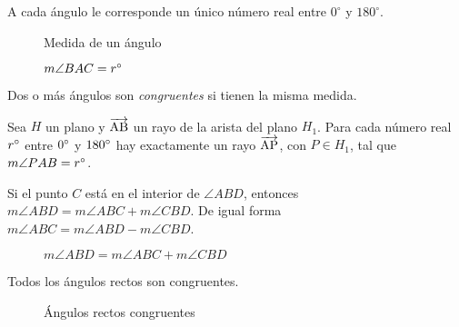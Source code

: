 \begin{postulate}
    A cada ángulo le corresponde un único número real entre $0^{\circ}$ y $180^{\circ}$.

\begin{figure}[!h]
    \centering
    
    \label{fig:angle-measure}
    \caption{Medida de un ángulo}
    \caption{$m\angle{BAC}=r^{\circ}$}
\end{figure}

\end{postulate}

\clearpage

\begin{definition}
    Dos o más ángulos son \textit{congruentes} si tienen la misma medida.
\end{definition}


\begin{postulate}
    Sea $H$ un plano y $\overrightarrow{\rm AB}$ un rayo de la arista del plano $H_1$. Para cada número real $r^{\circ}$ entre $0^{\circ}$ y $180^{\circ}$ hay exactamente un rayo $\overrightarrow{\rm AP}$, con $P \in H_1$, tal que $m\angle{PAB} = r^{\circ}$.

    \begin{figure}[!h]
        \centering
        
        \label{fig:angle-construction}
    \end{figure}
    
\end{postulate}

\begin{postulate}
    Si el punto $C$ está en el interior de $\angle{ABD}$, entonces $m\angle{ABD} = m\angle{ABC} + m\angle{CBD}$. De igual forma $m\angle{ABC} = m\angle{ABD} - m\angle{CBD}$.


    \begin{figure}[!h]
        \centering
        
        \label{fig:angle-addition}
        \caption{$m\angle{ABD} = m\angle{ABC} + m\angle{CBD}$}
    \end{figure}
    
\end{postulate}

\begin{postulate}
    Todos los ángulos rectos son congruentes.
    
    \begin{figure}[!h]
        \centering
        
        \caption{Ángulos rectos congruentes}
        \label{fig:postulate14}
    \end{figure}
    
\end{postulate}

